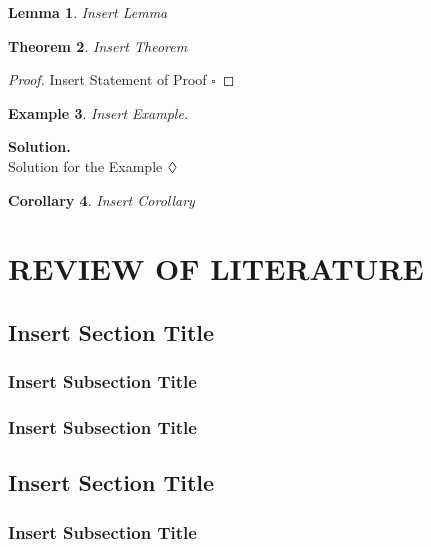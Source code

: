 \documentclass[12pt,a4paper,oneside]{book}
\theoremstyle{plain}
\newtheorem{thm}{Theorem}[chapter]
\newtheorem{lem}[thm]{Lemma}
\newtheorem{cor}[thm]{Corollary}
\newtheorem{ex}[thm]{Example}
\numberwithin{equation}{chapter}
\newcommand*{\QEDA}{\hfill\ensuremath{\large{\lozenge}}}
\newcommand*{\QEDAa}{\hfill\ensuremath{\square}}
\begin{document}
\vspace{1cm}

\begin{lem}\label{lem1}
	Insert Lemma
\end{lem}

\vspace{1cm}

\begin{thm}\label{thm1}
	Insert Theorem
\end{thm}

\noindent\begin{proof}
	Insert Statement of Proof
	\QEDAa
\end{proof}

\vspace{1cm}

\begin{ex}\label{ex1}
	Insert Example.
\end{ex}
\noindent\textbf{Solution.}\\
Solution for the Example \QEDA

\vspace{1cm}

\begin{cor}
	Insert Corollary
\end{cor}


\chapter*{REVIEW OF LITERATURE}
\section{Insert Section Title}\label{Sec3.1}
\subsection{Insert Subsection Title}\label{sub3.1.1}
\subsection{Insert Subsection Title}\label{sub3.1.2}

\section{Insert Section Title}\label{Sec3.2}
\subsection{Insert Subsection Title}\label{sub3.2.1}
\end{document}
